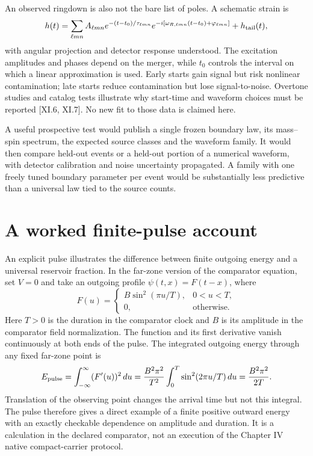 An observed ringdown is also not the bare list of poles. A schematic strain is
\begin{equation}
 h(t)=\sum_{\ell mn}A_{\ell mn}
 e^{-(t-t_0)/\tau_{\ell mn}}
 e^{-i[\omega_{R,\ell mn}(t-t_0)+\varphi_{\ell mn}]}
 +h_{\rm tail}(t),
 \label{c11:waveform}
\end{equation}
with angular projection and detector response understood. The excitation amplitudes and phases depend on the merger, while $t_0$ controls the interval on which a linear approximation is used. Early starts gain signal but risk nonlinear contamination; late starts reduce contamination but lose signal-to-noise. Overtone studies and catalog tests illustrate why start-time and waveform choices must be reported [XI.6, XI.7]. No new fit to those data is claimed here.

A useful prospective test would publish a single frozen boundary law, its mass--spin spectrum, the expected source classes and the waveform family. It would then compare held-out events or a held-out portion of a numerical waveform, with detector calibration and noise uncertainty propagated. A family with one freely tuned boundary parameter per event would be substantially less predictive than a universal law tied to the source counts.

\section{A worked finite-pulse account}
An explicit pulse illustrates the difference between finite outgoing energy and a universal reservoir fraction. In the far-zone version of the comparator equation, set $V=0$ and take an outgoing profile $\psi(t,x)=F(t-x)$, where
\begin{equation}
 F(u)=
 \begin{cases}
 B\sin^2(\pi u/T),&0<u<T,\\
 0,&\text{otherwise}.
 \end{cases}
 \label{c11:pulseprofile}
\end{equation}
Here $T>0$ is the duration in the comparator clock and $B$ is its amplitude in the comparator field normalization. The function and its first derivative vanish continuously at both ends of the pulse. The integrated outgoing energy through any fixed far-zone point is
\begin{equation}
 E_{\rm pulse}=\int_{-\infty}^{\infty}(F'(u))^2\,du
 =\frac{B^2\pi^2}{T^2}\int_0^T\sin^2(2\pi u/T)\,du
 =\frac{B^2\pi^2}{2T}.
 \label{c11:pulseenergy}
\end{equation}
Translation of the observing point changes the arrival time but not this integral. The pulse therefore gives a direct example of a finite positive outward energy with an exactly checkable dependence on amplitude and duration. It is a calculation in the declared comparator, not an execution of the Chapter IV native compact-carrier protocol.

